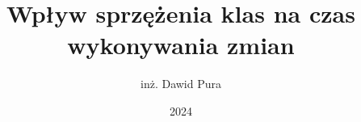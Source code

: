 \documentclass[thesis=mgr,faculty=ee]{EE-dyplom}
\title{Wpływ sprzężenia klas na czas wykonywania zmian}
\author{inż. Dawid Pura}
\date{2024}
\begin{document}
    \frontpages

    

    \bibliografia

    
    \acronymslist
    \listoffigures
    \listoftables
    \easyappendices
\end{document}
